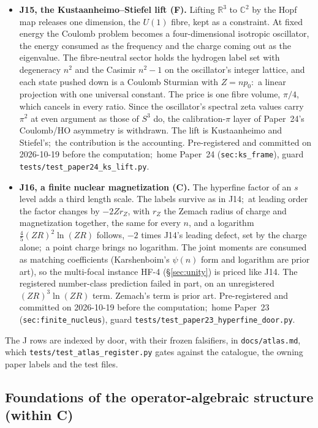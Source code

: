 \documentclass[11pt,a4paper]{article}
\theoremstyle{plain}
\theoremstyle{definition}
\begin{document}
\begin{itemize}
  \item \textbf{J15, the Kustaanheimo--Stiefel lift (F).} Lifting $\mathbb{R}^3$ to $\mathbb{C}^2$ by the Hopf map releases one dimension, the $U(1)$ fibre, kept as a constraint. At fixed energy the Coulomb problem becomes a four-dimensional isotropic oscillator, the energy consumed as the frequency and the charge coming out as the eigenvalue. The fibre-neutral sector holds the hydrogen label set with degeneracy $n^2$ and the Casimir $n^2 - 1$ on the oscillator's integer lattice, and each state pushed down is a Coulomb Sturmian with $Z = n p_0$:\ a linear projection with one universal constant. The price is one fibre volume, $\pi/4$, which cancels in every ratio. Since the oscillator's spectral zeta values carry $\pi^2$ at even argument as those of $S^3$ do, the calibration-$\pi$ layer of Paper~24's Coulomb/HO asymmetry is withdrawn. The lift is Kustaanheimo and Stiefel's;\ the contribution is the accounting. Pre-registered and committed on 2026-10-19 before the computation;\ home Paper~24 (\texttt{sec:ks\_frame}), guard \texttt{tests/test\_paper24\_ks\_lift.py}.
  \item \textbf{J16, a finite nuclear magnetization (C).} The hyperfine factor of an $s$ level adds a third length scale. The labels survive as in J14;\ at leading order the factor changes by $-2Zr_Z$, with $r_Z$ the Zemach radius of charge and magnetization together, the same for every $n$, and a logarithm $\tfrac45(ZR)^2\ln(ZR)$ follows, $-2$ times J14's leading defect, set by the charge alone;\ a point charge brings no logarithm. The joint moments are consumed as matching coefficients (Karshenboim's $\psi(n)$ form and logarithm are prior art), so the multi-focal instance HF-4 (\S\ref{sec:unity}) is priced like J14. The registered number-class prediction failed in part, on an unregistered $(ZR)^3\ln(ZR)$ term. Zemach's term is prior art. Pre-registered and committed on 2026-10-19 before the computation;\ home Paper~23 (\texttt{sec:finite\_nucleus}), guard \texttt{tests/test\_paper23\_hyperfine\_door.py}.
\end{itemize}

The J rows are indexed by door, with their frozen falsifiers, in \texttt{docs/atlas.md}, which \texttt{tests/test\_atlas\_register.py} gates against the catalogue, the owning paper labels and the test files.

\subsection{Foundations of the operator-algebraic structure (within C)}
\label{sec:forced_oa}
\end{document}
